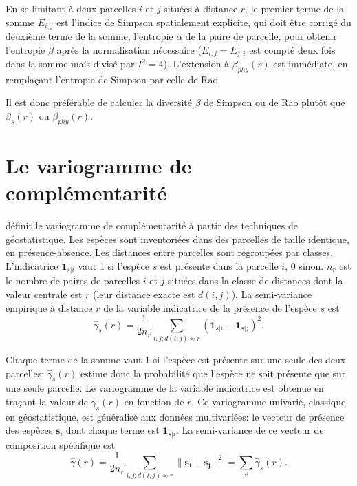 \documentclass[
  11pt,
  french,
  a4paper,
  extrafontsizes,onecolumn,openright
  ]{memoir}
\begin{document}
En se limitant à deux parcelles \(i\) et \(j\) situées à distance \(r\), le premier terme de la somme \(E_{i,j}\) est l'indice de Simpson spatialement explicite, qui doit être corrigé du deuxième terme de la somme, l'entropie \(\alpha\) de la paire de parcelle, pour obtenir l'entropie \(\beta\) après la normalisation nécessaire (\(E_{i,j}=E_{j,i}\) est compté deux fois dans la somme mais divisé par \(I^2=4\)).
L'extension à \(\beta_{phy}(r)\) est immédiate, en remplaçant l'entropie de Simpson par celle de Rao.

Il est donc préférable de calculer la diversité \(\beta\) de Simpson ou de Rao plutôt que \(\beta_{s}(r)\) ou \(\beta_{phy}(r)\).

\section{Le variogramme de complémentarité}\label{le-variogramme-de-compluxe9mentarituxe9}

\textcite{Wagner2003} définit le variogramme de complémentarité à partir des techniques de géostatistique.
Les espèces sont inventoriées dans des parcelles de taille identique, en présence-absence.
Les distances entre parcelles sont regroupées par classes.
L'indicatrice \({\mathbf 1}_{s|i}\) vaut 1 si l'espèce \(s\) est présente dans la parcelle \(i\), 0 sinon.
\(n_r\) est le nombre de paires de parcelles \(i\) et \(j\) situées dans la classe de distances dont la valeur centrale est \(r\) (leur distance exacte est \(d(i,j)\)).
La semi-variance empirique à distance \(r\) de la variable indicatrice de la présence de l'espèce \(s\) est
\begin{equation}
  \label{eq:Estgammasr}
  \hat{\gamma}_{s}(r) = \frac{1}{2 n_r} \sum_{i,j;d(i,j)\approx r}{({\mathbf 1}_{s|i} - {\mathbf 1}_{s|j})^2}.
\end{equation}

Chaque terme de la somme vaut 1 si l'espèce est présente sur une seule des deux parcelles: \(\hat{\gamma}_{s}(r)\) estime donc la probabilité que l'espèce ne soit présente que sur une seule parcelle.
Le variogramme de la variable indicatrice est obtenue en traçant la valeur de \(\hat{\gamma}_{s}(r)\) en fonction de \(r\).
Ce variogramme univarié, classique en géostatistique, est généralisé aux données multivariées: le vecteur de présence des espèces \(\mathbf{s_i}\) dont chaque terme est \({\mathbf 1}_{s|i}\).
La semi-variance de ce vecteur de composition spécifique est
\begin{equation}
  \label{eq:Estgammar}
  \hat{\gamma}(r) 
  = \frac{1}{2 n_r} \sum_{i,j;d(i,j)\approx r}{\| \mathbf{s_i}-\mathbf{s_j} \|^2}
  = \sum_{s}{\hat{\gamma}_{s}(r)}.
\end{equation}
\end{document}
